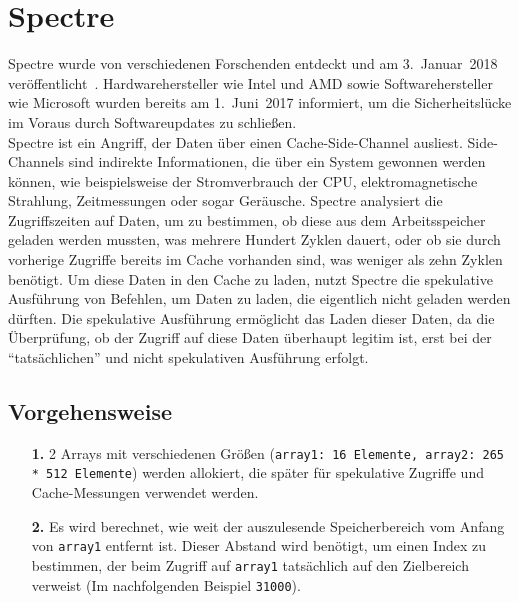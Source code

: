 \section{Spectre}
\label{sec:spectre}
Spectre wurde von verschiedenen Forschenden entdeckt und am 3.~Januar~2018 veröffentlicht~\cite{kocher2018spectre}.
Hardwarehersteller wie Intel und AMD sowie Softwarehersteller wie Microsoft wurden bereits am 1.~Juni~2017 informiert, um die Sicherheitslücke im Voraus durch Softwareupdates zu schließen. \\
Spectre ist ein Angriff, der Daten über einen Cache-Side-Channel ausliest.
Side-Channels sind indirekte Informationen, die über ein System gewonnen werden können, wie beispielsweise der Stromverbrauch der CPU, elektromagnetische Strahlung, Zeitmessungen oder sogar Geräusche.
Spectre analysiert die Zugriffszeiten auf Daten, um zu bestimmen, ob diese aus dem Arbeitsspeicher geladen werden mussten, was mehrere Hundert Zyklen dauert, oder ob sie durch vorherige Zugriffe bereits im Cache vorhanden sind, was weniger als zehn Zyklen benötigt.
Um diese Daten in den Cache zu laden, nutzt Spectre die spekulative Ausführung von Befehlen, um Daten zu laden, die eigentlich nicht geladen werden dürften.
Die spekulative Ausführung ermöglicht das Laden dieser Daten, da die Überprüfung, ob der Zugriff auf diese Daten überhaupt legitim ist, erst bei der \enquote{tatsächlichen} und nicht spekulativen Ausführung erfolgt.

\subsection{Vorgehensweise}
\label{subsec:spectre_vorgehensweise}
\begin{itemize}
	\item[\textbf{1.}] 2 Arrays mit verschiedenen Größen (\texttt{array1: 16 Elemente, array2: 265 * 512 Elemente}) werden allokiert, die später für spekulative Zugriffe und Cache-Messungen verwendet werden.
	\item[\textbf{2.}] Es wird berechnet, wie weit der auszulesende Speicherbereich vom Anfang von \texttt{array1} entfernt ist.
	      Dieser Abstand wird benötigt, um einen Index zu bestimmen, der beim Zugriff auf \texttt{array1} tatsächlich auf den Zielbereich verweist (Im nachfolgenden Beispiel \texttt{31000}).
\end{itemize}

